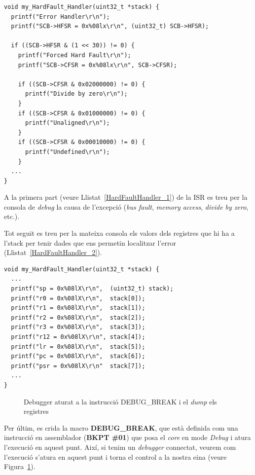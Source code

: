 \begin{lstlisting}[style=customc,caption=Codi HardFault\_Handler,label=HardFaultHandler_1]
void my_HardFault_Handler(uint32_t *stack) {
  printf("Error Handler\r\n");
  printf("SCB->HFSR = 0x%08lx\r\n", (uint32_t) SCB->HFSR);

  if ((SCB->HFSR & (1 << 30)) != 0) {
    printf("Forced Hard Fault\r\n");
    printf("SCB->CFSR = 0x%08lx\r\n", SCB->CFSR);

    if ((SCB->CFSR & 0x02000000) != 0) {
      printf("Divide by zero\r\n");
    }
    if ((SCB->CFSR & 0x01000000) != 0) {
      printf("Unaligned\r\n");
    }
    if ((SCB->CFSR & 0x00010000) != 0) {
      printf("Undefined\r\n");
    }
  ...
}
\end{lstlisting}

A la primera part (veure Llistat~\ref{HardFaultHandler_1}) de la \gls{ISR} es treu per la consola de {\em debug} la causa de l'excepció ({\em bus fault}, {\em memory access}, {\em divide by zero}, etc.).

Tot seguit es treu per la mateixa consola els valors dels registres que hi ha a l'\gls{stack} per tenir dades que ens permetin localitzar l'error (Llistat~\ref{HardFaultHandler_2}).

\begin{lstlisting}[style=customc,caption=Codi HardFault\_Handler (continuació),label=HardFaultHandler_2]
void my_HardFault_Handler(uint32_t *stack) {
  ...
  printf("sp = 0x%08lX\r\n",  (uint32_t) stack);
  printf("r0 = 0x%08lX\r\n",  stack[0]);
  printf("r1 = 0x%08lX\r\n",  stack[1]);
  printf("r2 = 0x%08lX\r\n",  stack[2]);
  printf("r3 = 0x%08lX\r\n",  stack[3]);
  printf("r12 = 0x%08lX\r\n", stack[4]);
  printf("lr = 0x%08lX\r\n",  stack[5]);
  printf("pc = 0x%08lX\r\n",  stack[6]);
  printf("psr = 0x%08lX\r\n"  stack[7]);
  ...
}
\end{lstlisting}


\begin{figure}
 \centering
 \caption{Debugger aturat a la instrucció DEBUG\_BREAK i el {\em dump} els registres}
 \label{fig:HardFaultDump}
\end{figure}


Per últim, es crida la macro {\bf DEBUG\_BREAK}, que està definida com una instrucció en assemblador ({\bf BKPT \#01}) que posa el {\em core} en mode {\em Debug} i atura l'execució en aquest punt. Així, si tenim un {\em debugger} connectat, veurem com l'execució s'atura en aquest punt i torna el control a la nostra eina (veure Figura~\ref{fig:HardFaultDump}).


